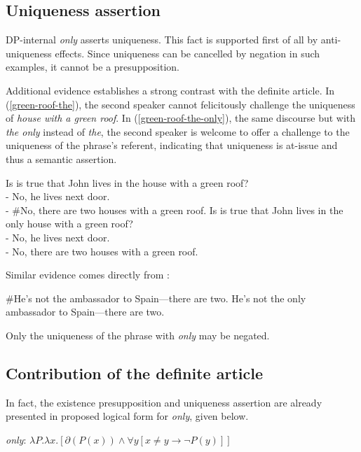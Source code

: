 \subsection{Uniqueness assertion}
DP-internal \textit{only} asserts uniqueness. This fact is supported first of all by anti-uniqueness effects. Since uniqueness can be cancelled by negation in such examples, it cannot be a presupposition.

Additional evidence establishes a strong contrast with the definite article. In (\ref{green-roof-the}), the second speaker cannot felicitously challenge the uniqueness of \textit{house with a green roof}. In (\ref{green-roof-the-only}), the same discourse but with \textit{the only} instead of \textit{the}, the second speaker is welcome to offer a challenge to the uniqueness of the phrase's referent, indicating that uniqueness is at-issue and thus a semantic assertion.

\begin{exe}
	\ex \label{green-roof-the} Is is true that John lives in the house with a green roof? \\
	    - No, he lives next door. \\
	    - \#No, there are two houses with a green roof.
	\ex \label{green-roof-the-only} Is is true that John lives in the only house with a green roof? \\
	    - No, he lives next door. \\
	    - No, there are two houses with a green roof.
\end{exe}

Similar evidence comes directly from \citet{cb2015}:

\begin{exe}
	\ex \#He's not the ambassador to Spain---there are two.
	\ex He's not the only ambassador to Spain---there are two.
\end{exe}

Only the uniqueness of the phrase with \textit{only} may be negated.

\subsection{Contribution of the definite article}
In fact, the existence presupposition and uniqueness assertion are already presented in  proposed logical form for \textit{only}, given below.

\begin{exe}
	\ex \textit{only}: $ \lambda P . \lambda x . [ \partial(P(x)) \land \forall y [ x \ne y \to \neg P(y) ] ] $
\end{exe}

